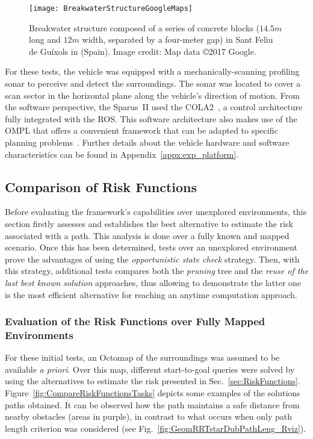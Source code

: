 \begin{figure}[htbp]
	\centering
	\texttt{[image: BreakwaterStructureGoogleMaps]} 
\caption[Satellite image of the breakwater structure that is composed of a
series of concrete blocks.] 
{Breakwater structure composed of a series of concrete blocks ($14.5m$ long and
$12m$ width, separated by a four-meter gap) in Sant Feliu de Gu\'ixols in
(Spain). Image credit: Map data \copyright 2017 Google.}
\label{fig:SantFeliu_Blocks}
\end{figure}

For these tests, the vehicle was equipped with a mechanically-scanning profiling
sonar to perceive and detect the surroundings. The sonar was located to cover a
scan sector in the horizontal plane along the vehicle's direction of motion.
From the software perspective, the Sparus~II used the
\ac{COLA2}~\cite{Palomeras2012}, a control architecture fully integrated with
the \ac{ROS}. This software architecture also makes use of the \ac{OMPL} that
offers a convenient framework that can be adapted to specific planning
problems~\cite{Sucan2012}. Further details about the vehicle hardware and
software characteristics can be found in Appendix~\ref{appx:exp_platform}.

\subsection{Comparison of Risk Functions}

Before evaluating the framework's capabilities over unexplored environments,
this section firstly assesses and establishes the best alternative to estimate the
risk associated with a path. This analysis is done over a fully known and mapped
scenario. Once this has been determined, tests over an unexplored environment
prove the advantages of using the \textit{opportunistic state check} strategy.
Then, with this strategy, additional tests compares both the
\textit{pruning} tree and the \textit{reuse of the last best known solution}
approaches, thus allowing to demonstrate the latter one is the most efficient
alternative for reaching an anytime computation approach.

\subsubsection{Evaluation of the Risk Functions over Fully Mapped Environments}

For these initial tests, an Octomap of the surroundings was assumed to be
available \textit{a priori}. Over this map, different start-to-goal queries were
solved by using the alternatives to estimate the risk presented in
Sec.~\ref{sec:RiskFunctions}. Figure~\ref{fig:CompareRiskFunctionsTasks} depicts
some examples of the solutions paths obtained. It can be observed how the path
maintains a safe distance from nearby obstacles (areas in purple), in contrast
to what occurs when only path length criterion was considered (see
Fig.~\ref{fig:GeomRRTstarDubPathLeng_Rviz}).

